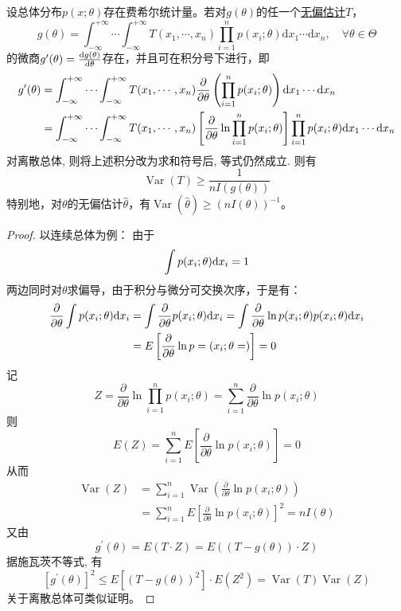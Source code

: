 \begin{theorem}\label{thm:Cramer-Rao_inequality}
    设总体分布$p(x;\theta)$存在费希尔统计量。若对$g(\theta)$的任一个\underline{无偏估计}$T$，
    \[ g(\theta)=\int_{-\infty}^{+\infty} \cdots \int_{-\infty}^{+\infty} T\left(x_{1}, \cdots, x_{n}\right) \prod_{i=1}^{n} p\left(x_{i} ; \theta\right) \mathrm{d} x_{1} \cdots \mathrm{d} x_{n} ,\quad \forall \theta \in \Theta\]
    的微商$g'(\theta)=\frac{\mathrm{d} g(\theta)}{\mathrm{d} \theta}$存在，并且可在积分号下进行，即
    \begin{align*}
        g^{\prime}(\theta) & =\int_{-\infty}^{+\infty} \cdots \int_{-\infty}^{+\infty} T(x_1, \cdots, x_n) \frac{\partial}{\partial \theta}\left(\prod_{i=1}^n p(x_i ; \theta)\right) \mathrm{d} x_1 \cdots \mathrm{d} x_n                                    \\
                           & =\int_{-\infty}^{+\infty} \cdots \int_{-\infty}^{+\infty} T(x_1, \cdots, x_n) \left[\frac{\partial}{\partial \theta} \ln \prod_{i=1}^n p(x_i ; \theta)\right] \prod_{i=1}^n p(x_i ; \theta) \mathrm{d} x_1 \cdots \mathrm{d} x_n
    \end{align*}
    对离散总体, 则将上述积分改为求和符号后, 等式仍然成立. 则有
    \[ \operatorname{Var}(T) \geq \frac1{n I(g(\theta))} \]
    特别地，对$\theta$的无偏估计$\hat{\theta}$，有$\operatorname{Var}(\hat{\theta})\geq (n I(\theta))^{-1}$。
\end{theorem}
\begin{proof}
    以连续总体为例：
    由于
    \[ \int p(x_i;\theta) \mathrm{d} x_i = 1 \]
    两边同时对$\theta$求偏导，由于积分与微分可交换次序，于是有：
    \begin{align*}
        \frac{\partial}{\partial \theta}\int p(x_i;\theta) \mathrm{d} x_i & = \int \frac{\partial}{\partial \theta}p(x_i;\theta) \mathrm{d} x_i = \int \frac{\partial}{\partial \theta}\ln p(x_i;\theta) p(x_i;\theta) \mathrm{d} x_i \\                                                                  & =E\left[\frac{\partial}{\partial \theta} \ln p=(x_i ; \theta=)\right]=0
    \end{align*}
    记
    \[ Z=\frac{\partial}{\partial \theta} \ln \prod_{i=1}^n p(x_i ; \theta)=\sum_{i=1}^n \frac{\partial}{\partial \theta} \ln p(x_i ; \theta) \]
    则
    \[ E(Z)=\sum_{i=1}^n E\left[\frac{\partial}{\partial \theta} \ln p(x_i ; \theta)\right]=0 \]
    从而
    \begin{align*}
        \operatorname{Var}(Z) & =\sum_{i=1}^{n} \operatorname{Var}\left(\frac{\partial}{\partial \theta} \ln p\left(x_{i} ; \theta\right)\right) \\
                              & =\sum_{i=1}^{n} E\left[\frac{\partial}{\partial \theta} \ln p\left(x_{i} ; \theta\right)\right]^{2}=n I(\theta)
    \end{align*}
    又由
    \[ g^{\prime}(\theta)=E(T \cdot Z)=E((T-g(\theta)) \cdot Z) \]
    据施瓦茨不等式, 有
    \[ \left[g^{\prime}(\theta)\right]^{2} \leq  E\left[(T-g(\theta))^{2}\right] \cdot E\left(Z^{2}\right)=\operatorname{Var}(T) \operatorname{Var}(Z)\]
    关于离散总体可类似证明。
\end{proof}

